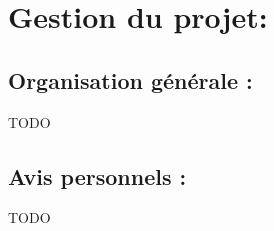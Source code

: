 \section{Gestion du projet:}

\subsection{Organisation générale :}
TODO

\subsection{Avis personnels :}
TODO
